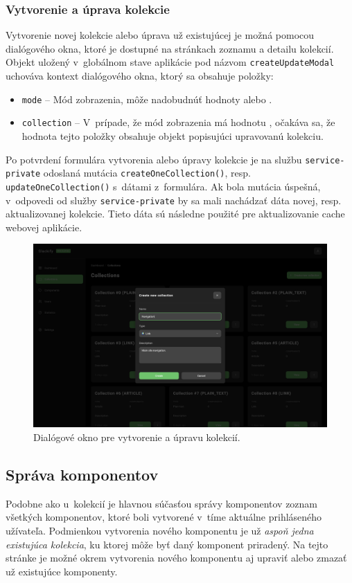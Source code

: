 \subsubsection{Vytvorenie a úprava kolekcie}
Vytvorenie novej kolekcie alebo úprava už existujúcej je možná pomocou dialógového okna, ktoré je dostupné na stránkach zoznamu a detailu kolekcií. Objekt uložený v~globálnom stave aplikácie pod názvom \texttt{createUpdateModal} uchováva kontext dialógového okna, ktorý sa obsahuje položky:

\begin{itemize}
	\item \texttt{mode} -- Mód zobrazenia, môže nadobudnúť hodnoty  alebo .
	\item \texttt{collection} -- V~prípade, že mód zobrazenia má hodnotu , očakáva sa, že hodnota tejto položky obsahuje objekt popisujúci upravovanú kolekciu.
\end{itemize}

\noindent Po potvrdení formulára vytvorenia alebo úpravy kolekcie je na službu \texttt{service-private} odoslaná mutácia \texttt{createOneCollection()}, resp. \texttt{updateOneCollection()} s~dátami z~formulára. Ak bola mutácia úspešná, v~odpovedi od služby \texttt{service-private} by sa mali nachádzať dáta novej, resp. aktualizovanej kolekcie. Tieto dáta sú následne použité pre aktualizovanie cache webovej aplikácie.

\begin{figure}[H]
	\centering
	\includegraphics[scale=0.085]{obrazky-figures/screenshot_collection_create}
	\caption{Dialógové okno pre vytvorenie a úpravu kolekcií.}
\end{figure}

\subsection{Správa komponentov}
Podobne ako u~kolekcií je hlavnou súčasťou správy komponentov zoznam všetkých komponentov, ktoré boli vytvorené v~tíme aktuálne prihláseného užívateľa. Podmienkou vytvorenia nového komponentu je už \emph{aspoň jedna existujúca kolekcia}, ku ktorej môže byť daný komponent priradený. Na tejto stránke je možné okrem vytvorenia nového komponentu aj upraviť alebo zmazať už existujúce komponenty.


